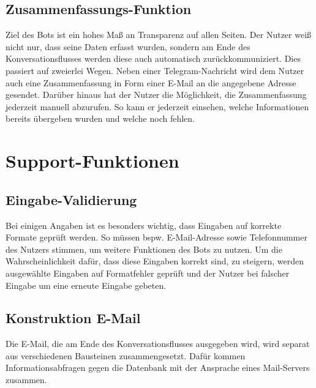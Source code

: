         \subsection{Zusammenfassungs-Funktion}
            Ziel des Bots ist ein hohes Maß an Transparenz auf allen Seiten. Der Nutzer weiß nicht nur, dass seine Daten erfasst wurden, sondern am Ende des Konversationsflusses werden diese auch automatisch zurückkommuniziert. Dies passiert auf zweierlei Wegen. Neben einer Telegram-Nachricht wird dem Nutzer auch eine Zusammenfassung in Form einer E-Mail an die angegebene Adresse gesendet. Darüber hinaus hat der Nutzer die Möglichkeit, die Zusammenfassung jederzeit manuell abzurufen. So kann er jederzeit einsehen, welche Informationen bereits übergeben wurden und welche noch fehlen.

            
    \section{Support-Funktionen}
        
        \subsection{Eingabe-Validierung}
        Bei einigen Angaben ist es besonders wichtig, dass Eingaben auf korrekte Formate geprüft werden. So müssen bspw. E-Mail-Adresse sowie Telefonnummer des Nutzers stimmen, um weitere Funktionen des Bots zu nutzen. Um die Wahrscheinlichkeit dafür, dass diese Eingaben korrekt sind, zu steigern, werden ausgewählte Eingaben auf Formatfehler geprüft und der Nutzer bei falscher Eingabe um eine erneute Eingabe gebeten.
        
        \subsection{Konstruktion E-Mail}
        Die E-Mail, die am Ende des Konversationsflusses ausgegeben wird, wird separat aus verschiedenen Bausteinen zusammengesetzt. Dafür kommen Informationsabfragen gegen die Datenbank mit der Ansprache eines Mail-Servers zusammen.
        
    
